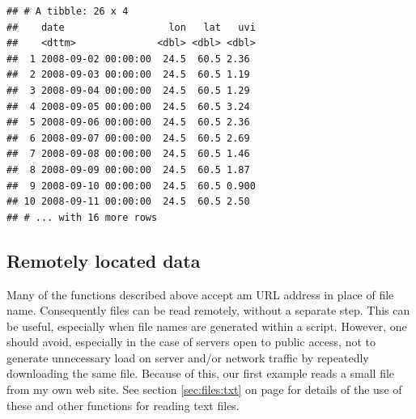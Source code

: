 \documentclass[krantz2]{krantz}\usepackage{knitr}%
\begin{document}
\begin{knitrout}\footnotesize
{}\color{fgcolor}\begin{kframe}
\begin{alltt}
 \hlkwb{<-}
    \hlstd{(} \hlstd{=}  \hlstd{=}\hlstd{),}
            \hlstd{= longitude[}\hlstd{],}
            \hlstd{= latitude[}\hlstd{],}
            \hlstd{=}  \hlstd{)[}\hlstd{,}\hlstd{,]}
           \hlstd{)}
\end{alltt}
\begin{verbatim}
## # A tibble: 26 x 4
##    date                  lon   lat   uvi
##    <dttm>              <dbl> <dbl> <dbl>
##  1 2008-09-02 00:00:00  24.5  60.5 2.36 
##  2 2008-09-03 00:00:00  24.5  60.5 1.19 
##  3 2008-09-04 00:00:00  24.5  60.5 1.29 
##  4 2008-09-05 00:00:00  24.5  60.5 3.24 
##  5 2008-09-06 00:00:00  24.5  60.5 2.36 
##  6 2008-09-07 00:00:00  24.5  60.5 2.69 
##  7 2008-09-08 00:00:00  24.5  60.5 1.46 
##  8 2008-09-09 00:00:00  24.5  60.5 1.87 
##  9 2008-09-10 00:00:00  24.5  60.5 0.900
## 10 2008-09-11 00:00:00  24.5  60.5 2.50 
## # ... with 16 more rows
\end{verbatim}
\end{kframe}
\end{knitrout}

\subsection{Remotely located data}\label{sec:files:remote}

Many of the functions described above accept am URL address in place of file name. Consequently files can be read remotely, without a separate step. This can be useful, especially when file names are generated within a script. However, one should avoid, especially in the case of servers open to public access, not to generate unnecessary load on server and/or network traffic by repeatedly downloading the same file. Because of this, our first example reads a small file from my own web site. See section \ref{sec:files:txt} on page \pageref{sec:files:txt} for details of the use of these and other functions for reading text files.

\begin{knitrout}\footnotesize
{}\color{fgcolor}\begin{kframe}
\begin{alltt}
 \hlkwb{<-}
      \hlstd{(} \hlstd{=} \hlstd{,}
                 \hlstd{=} \hlstd{,}
                 \hlstd{=} \hlstd{(}\hlstd{,} \hlstd{))}
\end{alltt}
\end{kframe}
\end{knitrout}
\end{document}
